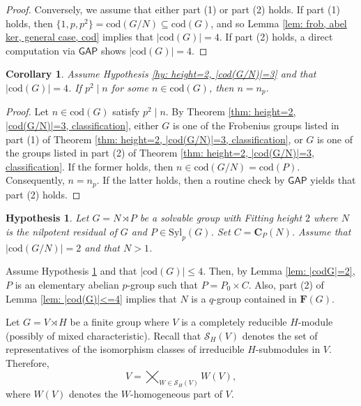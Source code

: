 \documentclass[9pt]{article}
\newtheorem{cor}[lem]{\bf Corollary}
\newtheorem{hy}[lem]{\bf Hypothesis}
\begin{document}
\begin{proof}
	Conversely, we assume that either part (1) or part (2) holds.
	If part (1) holds,
    then $\{  1,p,p^{2} \} = \mathrm{cod}(G/N)\subseteq \mathrm{cod}(G)$,
    and so Lemma \ref{lem: frob, abel ker, general case, cod} implies that $|\mathrm{cod}(G)|=4$.	
	If part (2) holds,
    a direct computation via $\mathsf{GAP}$ \cite{gap} shows $|\mathrm{cod}(G)|=4$.
\end{proof}



\begin{cor}\label{cor: height=2, |cod(G/N)|=3}
		Assume Hypothesis \ref{hy: height=2, |cod(G/N)|=3} and that $|\mathrm{cod}(G)|=4$.
	If $p^{2}\mid n$ for some $n\in \mathrm{cod}(G)$, then $n=n_p$.
\end{cor}
\begin{proof}
		 Let $n\in \mathrm{cod}(G)$ satisfy $p^{2}\mid n$.
	By Theorem \ref{thm: height=2, |cod(G/N)|=3, classification},
	either $G$ is one of the Frobenius groups listed in part (1) of Theorem \ref{thm: height=2, |cod(G/N)|=3, classification}, or $G$ is one of the groups listed in part (2) of Theorem \ref{thm: height=2, |cod(G/N)|=3, classification}.
	If the former holds, then $n\in \mathrm{cod}(G/N)=\mathrm{cod}(P)$.
	Consequently, $n=n_p$.
    If the latter holds, then a routine check by $\mathsf{GAP}$ \cite{gap} yields that part (2) holds.
\end{proof}






\begin{hy}\label{hy: height=2, |cod(G/N)|=2}
	Let $G=N \rtimes P$ be a solvable group with Fitting height $2$ where $N$ is the nilpotent residual of $G$ and $P\in \mathrm{Syl}_{p}(G)$.
	Set $C=\mathbf{C}_{P}(N)$.
	Assume that $|\mathrm{cod}(G/N)|=2$ and that $N>1$.	
 \end{hy}
 
Assume Hypothesis \ref{hy: height=2, |cod(G/N)|=2} and that $|\mathrm{cod}(G)|\leq 4$.
Then, by Lemma \ref{lem: |codG|=2}, $P$ is an elementary abelian $p$-group such that $P=P_0\times C$.
Also, part (2) of Lemma \ref{lem: |cod(G)|<=4} implies that $N$ is a $q$-group contained in $\mathbf{F}(G)$.



Let $G=V \rtimes H$ be a finite group where $V$ is a completely reducible $H$-module (possibly of mixed characteristic).
Recall that 
$\mathcal{S}_H(V)$ denotes the set of representatives of the isomorphism classes of irreducible $H$-submodules in $V$.
Therefore, 
$$V=\bigtimes_{W\in \mathcal{S}_H(V)} W(V),$$
where $W(V)$ denotes the $W$-homogeneous part of $V$.
\end{document}
